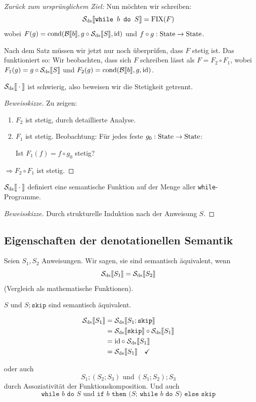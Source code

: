 \par\medskip
\emph{Zurück zum ursprünglichem Ziel:} Nun möchten wir schreiben: \[ \Sdssem{\texttt{while $b$ do $S$}} = \fix(F)
\] wobei $F(g) = \cond(\Bsem{b}, g \circ \Sdssem{S}, \id)$ und $f \circ g: \State \to \State$.


Nach dem Satz müssen wir jetzt nur noch überprüfen, dass $F$ stetig ist.
Das funktioniert so: Wir beobachten, dass sich $F$ schreiben lässt als $F = F_2 \circ F_1$, wobei $F_1(g) = g \circ \Sdssem{S}$
und $F_2(g) = \cond(\Bsem{b}, g, \id)$.

$\Sdssem{\cdot}$ ist schwierig, also beweisen wir die Stetigkeit getrennt.

\begin{proof}[Beweisskizze]
    Zu zeigen:
    \begin{enumerate}
        \item $F_2$ ist stetig, durch detaillierte Analyse.
        \item $F_1$ ist stetig. Beobachtung: Für jedes feste $g_0: \State \to \State$:

            Ist $F_1(f) = f \circ g_0$ stetig?
    \end{enumerate}
    $\Rightarrow F_2 \circ F_1$ ist stetig.
\end{proof}


\begin{theorem}
    $\Sdssem{\cdot}$ definiert eine semantische Funktion auf der Menge aller \texttt{while}-Programme.
\end{theorem}

\begin{proof}[Beweisskizze]
    Durch strukturelle Induktion nach der Anweisung $S$.
\end{proof}



\subsection{Eigenschaften der denotationellen Semantik}

Seien $S_1, S_2$ Anweisungen. Wir sagen, sie sind semantisch äquivalent, wenn \[
    \Sdssem{S_1} = \Sdssem{S_2}
\] (Vergleich als mathematische Funktionen).

\par\medskip
\begin{example}
    $S$ und $S; \texttt{skip}$ sind semantisch äquivalent.

    \begin{align*}
        \Sdssem{S_1} & = \Sdssem{S_1; \texttt{skip}} \\
        & =\Sdssem{\texttt{skip}} \circ \Sdssem{S_1} \\
        & = \id \circ \; \Sdssem{S_1} \\
        & = \Sdssem{S_1} \quad \checkmark
    \end{align*}

    oder auch \[
        S_1; (S_2; S_3) \text{ und } (S_1; S_2); S_3
    \] durch Assoziativität der Funktionskomposition. Und auch \[
        \texttt{while $b$ do $S$} \text{ und } \texttt{if $b$ then ($S$; while $b$ do $S$) else skip}
    \]
\end{example}



